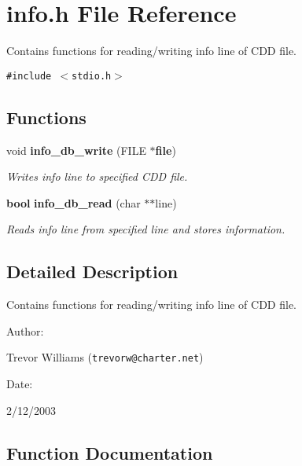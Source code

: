 \section{info.h File Reference}
\label{info_8h}
Contains functions for reading/writing info line of CDD file. 


{\tt \#include $<$stdio.h$>$}\par
\subsection*{Functions}
\begin{CompactItemize}
\item 
void {\bf info\_\-db\_\-write} (FILE $\ast${\bf file})
\begin{CompactList}\small\item\em Writes info line to specified CDD file.\item\end{CompactList}\item 
{\bf bool} {\bf info\_\-db\_\-read} (char $\ast$$\ast$line)
\begin{CompactList}\small\item\em Reads info line from specified line and stores information.\item\end{CompactList}\end{CompactItemize}


\subsection{Detailed Description}
Contains functions for reading/writing info line of CDD file.



\begin{Desc}
\item[Author: ]\par
Trevor Williams ({\tt trevorw@charter.net}) \end{Desc}
\begin{Desc}
\item[Date: ]\par
2/12/2003\end{Desc}


\subsection{Function Documentation}

